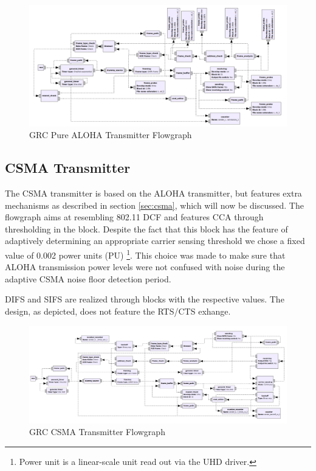 \begin{figure}
	\label{fig:grc-aloha-sender}
	\begin{center}
		\includegraphics[width=\textwidth]{pictures/grc_aloha_transmitter_flowgraph}
\end{center}
\caption{GRC Pure ALOHA Transmitter Flowgraph}
\end{figure}

\subsection{CSMA Transmitter}

The CSMA transmitter is based on the ALOHA transmitter, but features extra mechanisms as described in section \ref{sec:csma}, which will now be discussed. The flowgraph aims at resembling 802.11 DCF and features CCA through thresholding in the  block. Despite the fact that this block has the feature of adaptively determining an appropriate carrier sensing threshold we chose a fixed value of 0.002 power units (PU) \footnote{Power unit is a linear-scale unit read out via the UHD driver.}. This choice was made to make sure that ALOHA transmission power levels were not confused with noise during the adaptive CSMA noise floor detection period. 

DIFS and SIFS are realized through  blocks with the respective values. The design, as depicted, does not feature the RTS/CTS exhange.

\begin{figure}
	\label{fig:grc-csma-sender}
	\begin{center}
		\includegraphics[width=\textwidth]{pictures/grc_csma_transmitter_flowgraph}
\end{center}
\caption{GRC CSMA Transmitter Flowgraph}
\end{figure}

